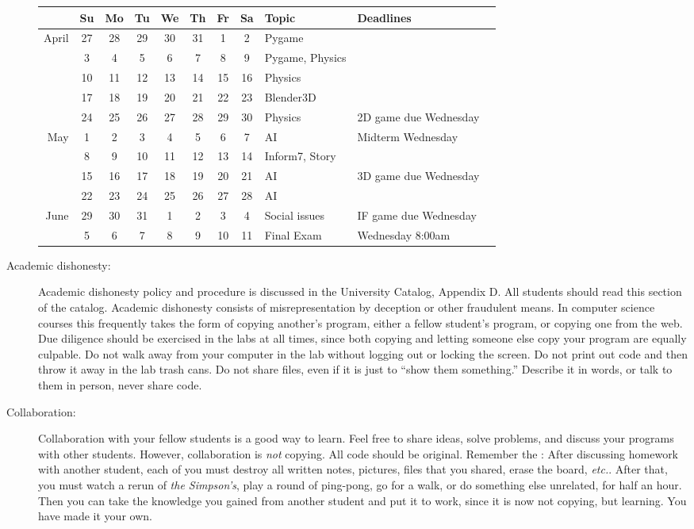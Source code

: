 \documentclass{article}
\begin{document}
\begin{description}
\begin{tabular}{r|ccccccc|lll}                      
     &Su& Mo& Tu& We& Th& Fr& Sa&Topic & Deadlines \\\hline  
April
& 27 & 28 & 29 & 30 & 31 &  1 &  2 & Pygame\\
&  3 &  4 &  5 &  6 &  7 &  8 &  9 &  Pygame, Physics\\
& 10 & 11 & 12 & 13 & 14 & 15 & 16 &  Physics\\
& 17 & 18 & 19 & 20 & 21 & 22 & 23 &  Blender3D\\
& 24 & 25 & 26 & 27 & 28 & 29 & 30 &  Physics & 2D game due Wednesday\\
May
&  1 &  2 &  3 &  4 &  5 &  6 &  7 &  AI & Midterm Wednesday\\
&  8 &  9 & 10 & 11 & 12 & 13 & 14 &  Inform7, Story\\
& 15 & 16 & 17 & 18 & 19 & 20 & 21 &  AI & 3D game due Wednesday\\
& 22 & 23 & 24 & 25 & 26 & 27 & 28 &  AI\\
June
& 29 & {\color{gray}30} & 31 &  1 &  2 &  3 &  4 &  Social issues &IF game due Wednesday\\
&  5 &  6 &  7 &  8 &  9 & 10 & 11 &  Final Exam &Wednesday 8:00am\\
\end{tabular}

\item [Academic dishonesty:] Academic dishonesty policy and
  procedure is discussed in the University Catalog, Appendix D.  All
  students should read this section of the catalog.  Academic
  dishonesty consists of misrepresentation by deception or other
  fraudulent means.  In computer science courses this frequently takes
  the form of copying another's program, either a fellow student's
  program, or copying one from the web.  Due diligence should be
  exercised in the labs at all times, since both copying and letting
  someone else copy your program are equally culpable.  Do not walk
  away from your computer in the lab without logging out or locking
  the screen.  Do not print out code and then throw it away in the lab
  trash cans. Do not share files, even if it is just to ``show them
  something.''  Describe it in words, or talk to them in person, never
  share code.

\item [Collaboration:] Collaboration with your fellow students is
  a good way to learn.  Feel free to share ideas, solve problems, and
  discuss your programs with other students.  However, collaboration
  is {\em not} copying.  All code should be original.  Remember the
  : After discussing homework with
  another student, each of you must destroy all written notes,
  pictures, files that you shared, erase the board, {\em
    etc.}.  After that, you must watch a rerun of {\em the Simpson's},
  play a round of ping-pong, go for a walk, or do something else
  unrelated, for half an hour.  Then you can take the knowledge you
  gained from another student and put it to work, since it is now not
  copying, but learning.  You have made it your own.

\end{description}
\end{document}
